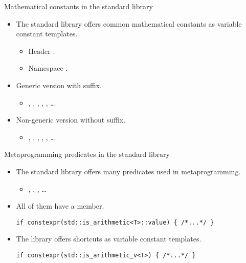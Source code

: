 \begin{frame}[t,fragile]{Mathematical constants in the standard library}
\begin{itemize}
  \item The standard library offers common mathematical constants as variable constant templates.
    \begin{itemize}
      \item Header .
      \item Namespace .
    \end{itemize}

  \item Generic version with  suffix.
    \begin{itemize}
      \item {}, , , , , \ldots
    \end{itemize}

  \item Non-generic  version without  suffix.
    \begin{itemize}
      \item {}, , , , , \ldots
    \end{itemize}
\end{itemize}
\end{frame}

\begin{frame}[t,fragile]{Metaprogramming predicates in the standard library}
\begin{itemize}
  \item The standard library offers many predicates used in metaprogramming.
    \begin{itemize}
      \item {}, , , \ldots
    \end{itemize}

  \item All of them have a  member.
\begin{lstlisting}
if constexpr(std::is_arithmetic<T>::value) { /*...*/ }
\end{lstlisting}

  \item The library offers shortcuts as variable constant templates.
\begin{lstlisting}
if constexpr(std::is_arithmetic_v<T>) { /*...*/ }
\end{lstlisting}
\end{itemize}
\end{frame}
